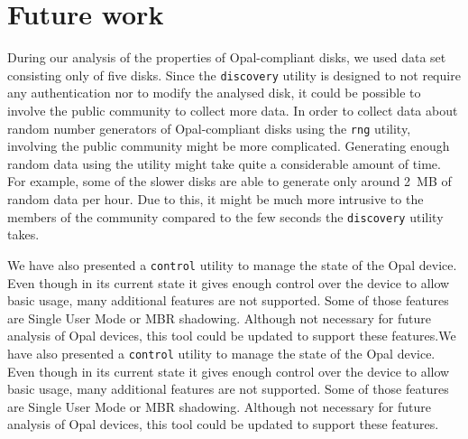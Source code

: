 

\section{Future work}


During our analysis of the properties of Opal-compliant disks, we used data set consisting only of five disks. Since the \verb|discovery| utility is designed to not require any authentication nor to modify the analysed disk, it could be possible to involve the public community to collect more data. In order to collect data about random number generators of Opal-compliant disks using the \verb|rng| utility, involving the public community might be more complicated. Generating enough random data using the utility might take quite a considerable amount of time. For example, some of the slower disks are able to generate only around 2~MB of random data per hour. Due to this, it might be much more intrusive to the members of the community compared to the few seconds the \verb|discovery| utility takes.

We have also presented a \verb|control| utility to manage the state of the Opal device. Even though in its current state it gives enough control over the device to allow basic usage, many additional features are not supported. Some of those features are Single User Mode or MBR shadowing. Although not necessary for future analysis of Opal devices, this tool could be updated to support these features.We have also presented a \verb|control| utility to manage the state of the Opal device. Even though in its current state it gives enough control over the device to allow basic usage, many additional features are not supported. Some of those features are Single User Mode or MBR shadowing. Although not necessary for future analysis of Opal devices, this tool could be updated to support these features.










\newpage

\setcounter{biburllcpenalty}{7000}
\setcounter{biburlucpenalty}{8000}
\printbibliography[heading=bibintoc] %



